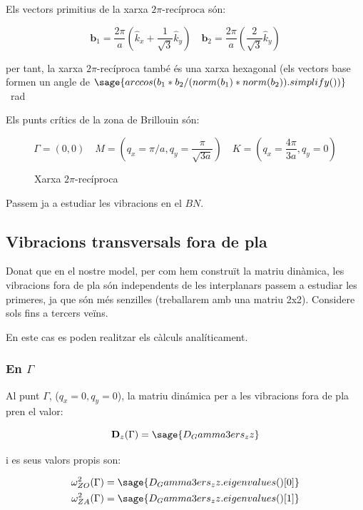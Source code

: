 \documentclass[12pt]{article} %
\let\vec\mathbf %
\begin{document}
Els vectors primitius de la xarxa $2\pi\text{-recíproca}$ són:

\begin{equation}
\label{eq:11}
\vec b_1=\frac{2\pi}{a}\left(\hat k_{x}+\frac{1}{\sqrt{3}}\hat k_{y}\right)\quad \vec b_2=\frac{2\pi}{a}\left(\frac{2}{\sqrt{3}}\hat k_y\right)
\end{equation} 

per tant, la xarxa $2\pi$-recíproca també és una xarxa hexagonal (els vectors base formen un angle de $\sage{arccos(b_1*b_2/(norm(b_1)*norm(b_2)).simplify())}$ \SI{}{\radian}

Els punts crítics de la zona de Brillouin són:

\begin{equation}
 \label{puntsbrillouin}
 \Gamma=(0,0)\quad M=\left(q_x=\pi/a,q_y=\frac{\pi}{\sqrt{3 a}}\right)\quad K=\left(q_x=\frac{4\pi}{3 a}, q_y=0\right)
\end{equation}

\newpage
\begin{figure}[h]
\centering
{}
\caption{Xarxa $2\pi$-recíproca}
\end{figure}


Passem ja a estudiar les vibracions en el $BN$.
\subsection{Vibracions transversals fora de pla}
Donat que en el nostre model, per com hem construït la matriu dinàmica, les vibracions fora de pla són independents de les interplanars passem a estudiar les primeres, ja que són més senzilles (treballarem amb una matriu 2x2). Considere sols fins a tercers veïns.

En este cas es poden realitzar els càlculs analíticament.

\subsubsection{En $\Gamma$}
Al punt $\Gamma$, ($q_x=0, q_y=0$), la matriu dinámica  per a les vibracions fora de pla pren el valor:

\begin{equation}
\vec D_z(\Gamma)=\sage{D_Gamma3ers_zz}
\end{equation}

i es seus valors propis son:

\begin{equation}\begin{split}
\omega_{ZO}^2(\Gamma)&=\sage{D_Gamma3ers_zz.eigenvalues()[0]}\\
\omega_{ZA}^2(\Gamma)&=\sage{D_Gamma3ers_zz.eigenvalues()[1]} 
\end{split}
\end{equation}
\end{document}
